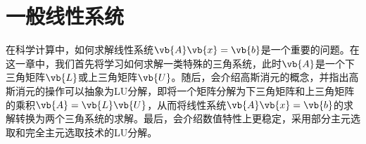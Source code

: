 \chapter{一般线性系统}

在科学计算中，如何求解线性系统$\vb{A}\vb{x}=\vb{b}$是一个重要的问题。在这一章中，我们首先将学习如何求解一类特殊的三角系统，此时$\vb{A}$是一个下三角矩阵$\vb{L}$或上三角矩阵$\vb{U}$。随后，会介绍高斯消元的概念，并指出高斯消元的操作可以抽象为LU分解，即将一个矩阵分解为下三角矩阵和上三角矩阵的乘积$\vb{A}=\vb{L}\vb{U}$，从而将线性系统$\vb{A}\vb{x}=\vb{b}$的求解转换为两个三角系统的求解。最后，会介绍数值特性上更稳定，采用部分主元选取和完全主元选取技术的LU分解。





